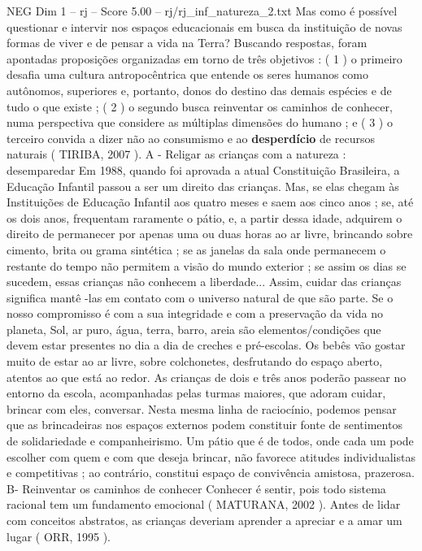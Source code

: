 \begin{textsample}{NEG Dim 1 – rj – Score 5.00 – rj/rj\_inf\_natureza\_2.txt}  \label{ex:f1_neg_012}
Mas como é possível questionar e intervir nos espaços educacionais em busca da instituição de novas formas de viver e de pensar a vida na Terra?
Buscando respostas, foram apontadas proposições organizadas em torno de três objetivos : ( 1 ) o primeiro desafia uma cultura antropocêntrica que entende os seres humanos como autônomos, superiores e, portanto, donos do destino das demais espécies e de tudo o que existe ; ( 2 ) o segundo busca reinventar os caminhos de conhecer, numa perspectiva que considere as múltiplas dimensões do humano ; e ( 3 ) o terceiro convida a dizer não ao consumismo e ao \textbf{desperdício} de recursos naturais ( TIRIBA, 2007 ).
A - Religar as crianças com a natureza : desemparedar Em 1988, quando foi aprovada a atual Constituição Brasileira, a Educação Infantil passou a ser um direito das crianças.
Mas, se elas chegam às Instituições de Educação Infantil aos quatro meses e saem aos cinco anos ; se, até os dois anos, frequentam raramente o pátio, e, a partir dessa idade, adquirem o direito de permanecer por apenas uma ou duas horas ao ar livre, brincando sobre cimento, brita ou grama sintética ; se as janelas da sala onde permanecem o restante do tempo não permitem a visão do mundo exterior ; se assim os dias se sucedem, essas crianças não conhecem a liberdade...
Assim, cuidar das crianças significa mantê -las em contato com o universo natural de que são parte.
Se o nosso compromisso é com a sua integridade e com a preservação da vida no planeta, Sol, ar puro, água, terra, barro, areia são elementos/condições que devem estar presentes no dia a dia de creches e pré-escolas.
Os bebês vão gostar muito de estar ao ar livre, sobre colchonetes, desfrutando do espaço aberto, atentos ao que está ao redor.
As crianças de dois e três anos poderão passear no entorno da escola, acompanhadas pelas turmas maiores, que adoram cuidar, brincar com eles, conversar.
Nesta mesma linha de raciocínio, podemos pensar que as brincadeiras nos espaços externos podem constituir fonte de sentimentos de solidariedade e companheirismo.
Um pátio que é de todos, onde cada um pode escolher com quem e com que deseja brincar, não favorece atitudes individualistas e competitivas ; ao contrário, constitui espaço de convivência amistosa, prazerosa.
B- Reinventar os caminhos de conhecer Conhecer é sentir, pois todo sistema racional tem um fundamento emocional ( MATURANA, 2002 ).
Antes de lidar com conceitos abstratos, as crianças deveriam aprender a apreciar e a amar um lugar ( ORR, 1995 ).

\end{textsample}
